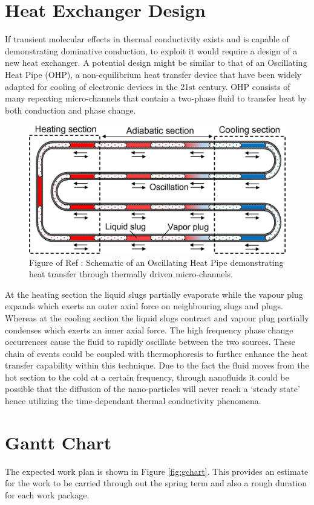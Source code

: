 \documentclass[12pt,MEng]{UoAThesis}
\begin{document}
\section{Heat Exchanger Design}
If transient molecular effects in thermal conductivity exists and is capable of demonstrating dominative conduction, to exploit it would require a design of a new heat exchanger. A potential design might be similar to that of an Oscillating Heat Pipe (OHP), a non-equilibrium heat transfer device that have been widely adapted for cooling of electronic devices in the 21st century. OHP consists of many repeating  micro-channels that contain a two-phase fluid to transfer heat by both conduction and phase change. 

\begin{figure}[htp]
  \centering
  \includegraphics[clip,width=0.8\linewidth]{figures/OHP}
  \caption{\label{fig:OHP} Figure of Ref \cite{OHP}: Schematic of an Oscillating Heat Pipe demonstrating heat transfer through thermally driven micro-channels.}
\end{figure}

\noindent At the heating section the liquid slugs partially evaporate while the vapour plug expands which exerts an outer axial force on neighbouring slugs and plugs. Whereas at the cooling section the liquid slugs contract and vapour plug partially condenses which exerts an inner axial force. The high frequency phase change occurrences cause the fluid to rapidly oscillate between the two sources. These chain of events could be coupled with thermophoresis to further enhance the heat transfer capability within this technique. Due to the fact the fluid moves from the hot section to the cold at a certain frequency, through nanofluids it could be possible that the diffusion of the nano-particles will never reach a `steady state' hence utilizing the time-dependant thermal conductivity phenomena.

\newpage

\section{Gantt Chart}
The expected work plan is shown in Figure \ref{fig:gchart}. This provides an estimate for the work to be carried through out the spring term and also a rough duration for each work package. 
\end{document}
